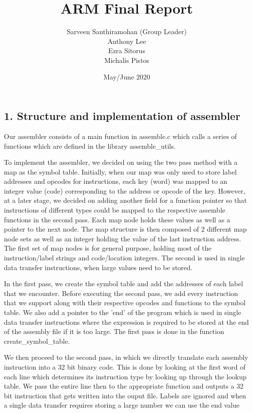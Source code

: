 \documentclass[a4paper]{article}
\title{ARM Final Report}
\author{Sarveen Santhiramohan (Group Leader) \\ Anthony Lee\\ Ezra Sitorus\\ Michalis Pistos}
\date{May/June 2020}
\begin{document}
\maketitle

\bigskip
\subsection*{1. Structure and implementation of assembler}

Our assembler consists of a main function in assemble.c which calls a series of functions which
are defined in the library assemble{\_}utils. 

To implement the assembler, we decided on using the two pass method with a map as the symbol table.
Initially, when our map was only used to store label addresses and opcodes for instructions, each
key (word) was mapped to an integer value (code) corresponding to the address or opcode of the key.
However, at a later stage, we decided on adding another field for a function pointer so that instructions
of different types could be mapped to the respective assemble functions in the second pass. Each map node holds
these values as well as a pointer to the next node. The map structure is then composed of 2 different map node sets
as well as an integer holding the value of the last instruction address. The first set of map nodes is for general 
purpose, holding most of the instruction/label strings and code/location integers. The second is used in single data
transfer instructions, when large values need to be stored.
\par
In the first pass, we create the symbol table and add the addresses of each label that we encounter.
Before executing the second pass, we add every instruction that we support along with their
respective opcodes and functions to the symbol table. We also add a pointer to the 'end' of the program
which is used in single data transfer instructions where the expression is required to be stored at the 
end of the assembly file if it is too large. The first pass is done in the function create{\_}symbol{\_}table.
\par
We then proceed to the second pass, in which we directly translate each assembly instruction into a 32 bit binary code.
This is done by looking at the first word of each line which determines its instruction type by looking up through the 
lookup table. We pass the entire line then to the appropriate function and outputs a 32 bit instruction that gets written 
into the ouput file. Labels are ignored and when a single data transfer requires storing a large number we can use the end value 
\end{document}
